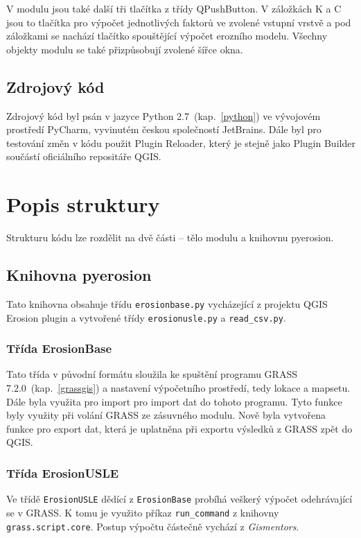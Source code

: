 V modulu jsou také další tři tlačítka z třídy QPushButton. V záložkách K a C jsou to tlačítka pro výpočet jednotlivých faktorů ve zvolené vstupní vrstvě a pod záložkami se nachází tlačítko spouštějící výpočet erozního modelu. Všechny objekty modulu se také přizpůsobují zvolené šířce okna.
\subsection{Zdrojový kód}
Zdrojový kód byl psán v jazyce Python 2.7~(kap.~\ref{python}) ve vývojovém prostředí PyCharm, vyvinutém českou společností JetBrains. Dále byl pro testování změn v kódu použit Plugin Reloader, který je stejně jako Plugin Builder součástí oficiálního repositáře QGIS.

\section{Popis struktury}
Strukturu kódu lze rozdělit na dvě části – tělo modulu a knihovnu pyerosion. 
\subsection{Knihovna pyerosion}
Tato knihovna obsahuje třídu \texttt{erosionbase.py} vycházející z projektu QGIS Erosion plugin\cite{erosiongithub} a vytvořené třídy \texttt{erosionusle.py} a \texttt{read\_csv.py}.
\subsubsection{Třída ErosionBase}
Tato třída v původní formátu sloužila ke spuštění programu GRASS 7.2.0~(kap.~\ref{grassgis}) a nastavení výpočetního prostředí, tedy lokace a mapsetu. Dále byla využita pro import pro import dat do tohoto programu. Tyto funkce byly využity při volání GRASS ze zásuvného modulu. Nově byla vytvořena funkce pro export dat, která je uplatněna při exportu výsledků z GRASS zpět do QGIS.
\subsubsection{Třída ErosionUSLE}
Ve třídě \texttt{ErosionUSLE} dědící z \texttt{ErosionBase} probíhá veškerý výpočet odehrávající se v GRASS. K tomu je využito příkaz \texttt{run\_command} z knihovny \texttt{grass.script.core}. Postup výpočtu částečně vychází z \textit{Gismentors}\cite{gismentors}.

